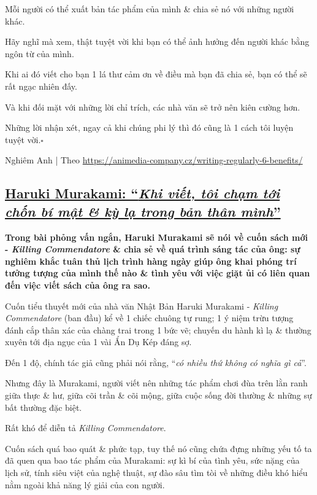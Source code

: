 \documentclass{article}
\begin{document}
Mỗi người có thể xuất bản tác phẩm của mình \& chia sẻ nó với những người khác.

%
Hãy nghĩ mà xem, thật tuyệt vời khi bạn có thể ảnh hưởng đến người khác bằng ngôn từ của mình.

Khi ai đó viết cho bạn 1 lá thư cảm ơn về điều mà bạn đã chia sẻ, bạn có thể sẽ rất ngạc nhiên đấy.

%
Và khi đối mặt với những lời chỉ trích, các nhà văn sẽ trở nên kiên cường hơn.

Những lời nhận xét, ngay cả khi chúng phi lý thì đó cũng là 1 cách tôi luyện tuyệt vời.\hfill$\square$

\begin{flushright}
	Nghiêm Anh | Theo \url{https://animedia-company.cz/writing-regularly-6-benefits/}
\end{flushright}


\subsection{\href{http://tramdoc.vn/tin-tuc/haruki-murakami-khi-viet-toi-cham-toi-chon-bi-mat-va-ki-la-trong-ban-than-minh-nZNYLW.html}{Haruki Murakami: ``\textit{Khi viết, tôi chạm tới chốn bí mật \& kỳ lạ trong bản thân mình}''}}

\textbf{Trong bài phỏng vấn ngắn, Haruki Murakami sẽ nói về cuốn sách mới - \textit{Killing Commendatore} \& chia sẻ về quá trình sáng tác của ông: sự nghiêm khắc tuân thủ lịch trình hàng ngày giúp ông khai phóng trí tưởng tượng của mình thế nào \& tình yêu với việc giặt ủi có liên quan đến việc viết sách của ông ra sao.}

%
Cuốn tiểu thuyết mới của nhà văn Nhật Bản Haruki Murakami - \textit{Killing Commendatore} (ban đầu) kể về 1 chiếc chuông tự rung; 1 ý niệm trừu tượng đánh cắp thân xác của chàng trai trong 1 bức vẽ; chuyến du hành kì lạ \& thường xuyên tới địa ngục của 1 vài Ẩn Dụ Kép đáng sợ.

Đến 1 độ, chính tác giả cũng phải nói rằng, ``\textit{có nhiều thứ không có nghĩa gì cả}''.

%
Nhưng đây là Murakami, người viết nên những tác phẩm chơi đùa trên lằn ranh giữa thực \& hư, giữa cõi trần \& cõi mộng, giữa cuộc sống đời thường \& những sự bất thường đặc biệt.

Rất khó để diễn tả \textit{Killing Commendatore}.

Cuốn sách quá bao quát \& phức tạp, tuy thế nó cũng chứa đựng những yếu tố ta đã quen qua bao tác phẩm của Murakami: sự kì bí của tình yêu, sức nặng của lịch sử, tính siêu việt của nghệ thuật, sự đào sâu tìm tòi về những điều khó hiểu nằm ngoài khả năng lý giải của con người.
\end{document}
